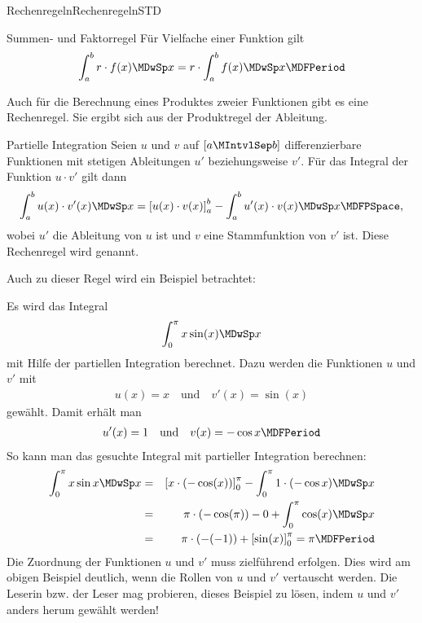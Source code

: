 \begin{MXContent}{Rechenregeln}{Rechenregeln}{STD}
\begin{MXInfo}{Summen- und Faktorregel}
Für Vielfache einer Funktion gilt
\begin{equation}
\int_a^b r \cdot f(x) \MDwSp x = r \cdot \int_a^b f(x) \MDwSp x \MDFPeriod %
\end{equation}
\end{MXInfo}

\begin{MCOSHZusatz}
Auch für die Berechnung eines Produktes zweier Funktionen gibt es eine 
Rechenregel. Sie ergibt sich aus der Produktregel der Ableitung.

\begin{MXInfo}{Partielle Integration}
Seien $u$ und $v$ auf $[a\MIntvlSep b]$ differenzierbare Funktionen mit 
stetigen Ableitungen $u'$ beziehungsweise $v'$. 
Für das Integral der Funktion $u \cdot v'$ gilt dann
%
$$
\int_a^b u(x) \cdot v'(x) \MDwSp x %
 = \left[u(x)\cdot v(x)\right]_a^b - \int_a^b u'(x) \cdot v(x) \MDwSp x \MDFPSpace, %
$$
%
wobei $u'$ die Ableitung von $u$ ist und $v$ eine Stammfunktion von $v'$ ist.
Diese Rechenregel wird  
genannt.
\end{MXInfo}

Auch zu dieser Regel wird ein Beispiel betrachtet:

\begin{MExample}
Es wird das Integral
%
$$
\int_{0}^{\pi} x \sin(x) \MDwSp x
$$
%
mit Hilfe der partiellen Integration berechnet. Dazu werden die Funktionen $u$ 
und $v'$ mit
%
\begin{eqnarray*}
u(x) = x \quad \text{und} \quad v'(x) = \sin(x) %
\end{eqnarray*}
%
gewählt. Damit erhält man 
%
\begin{eqnarray*}
u'(x) = 1 \quad\text{und}\quad v(x) = -\cos x \MDFPeriod
\end{eqnarray*}
%
So kann man das gesuchte Integral mit partieller Integration berechnen:
%
\begin{eqnarray*}
\int_{0}^{\pi} x \sin x \MDwSp x %
& = & \left[x \cdot (-\cos(x))\right]_0^\pi %
      - \int_{0}^{\pi} 1 \cdot (-\cos x) \MDwSp x \\
& = & \pi \cdot (-\cos(\pi)) - 0 + \int_{0}^{\pi} \cos(x) \MDwSp x \\
& = & \pi \cdot (-(-1)) + \left[\sin(x)\right]_0^\pi = \pi \MDFPeriod
\end{eqnarray*}
%
Die Zuordnung der Funktionen $u$ und $v'$ muss zielführend erfolgen. Dies wird 
am obigen Beispiel deutlich, wenn die Rollen von $u$ und $v'$ vertauscht werden. 
Die Leserin bzw. der Leser mag probieren, dieses Beispiel zu lösen, indem $u$ 
und $v'$ anders herum gewählt werden!
\end{MExample}


\end{MCOSHZusatz}
\end{MXContent}
